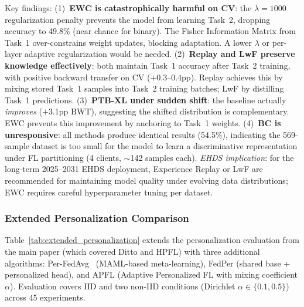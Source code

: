 \documentclass[conference]{IEEEtran}
\begin{document}
\begin{table}[htbp]
\vspace{1mm}
\footnotesize{Key findings: (1)~\textbf{EWC is catastrophically harmful on CV}: the $\lambda{=}1000$ regularization penalty prevents the model from learning Task~2, dropping accuracy to 49.8\% (near chance for binary). The Fisher Information Matrix from Task~1 over-constrains weight updates, blocking adaptation. A lower $\lambda$ or per-layer adaptive regularization would be needed. (2)~\textbf{Replay and LwF preserve knowledge effectively}: both maintain Task~1 accuracy after Task~2 training, with positive backward transfer on CV ($+$0.3--0.4pp). Replay achieves this by mixing stored Task~1 samples into Task~2 training batches; LwF by distilling Task~1 predictions. (3)~\textbf{PTB-XL under sudden shift}: the baseline actually \textit{improves} ($+$3.1pp BWT), suggesting the shifted distribution is complementary. EWC prevents this improvement by anchoring to Task~1 weights. (4)~\textbf{BC is unresponsive}: all methods produce identical results (54.5\%), indicating the 569-sample dataset is too small for the model to learn a discriminative representation under FL partitioning (4 clients, $\sim$142 samples each). \textit{EHDS implication}: for the long-term 2025--2031 EHDS deployment, Experience Replay or LwF are recommended for maintaining model quality under evolving data distributions; EWC requires careful hyperparameter tuning per dataset.}
\end{table}

\subsubsection{Extended Personalization Comparison}
\label{sec:extended_pers_exp}

Table~\ref{tab:extended_personalization} extends the personalization evaluation from the main paper (which covered Ditto and HPFL) with three additional algorithms: Per-FedAvg~\cite{fallah2020personalized} (MAML-based meta-learning), FedPer (shared base + personalized head), and APFL (Adaptive Personalized FL with mixing coefficient $\alpha$). Evaluation covers IID and two non-IID conditions (Dirichlet $\alpha \in \{0.1, 0.5\}$) across 45 experiments.
\end{document}
